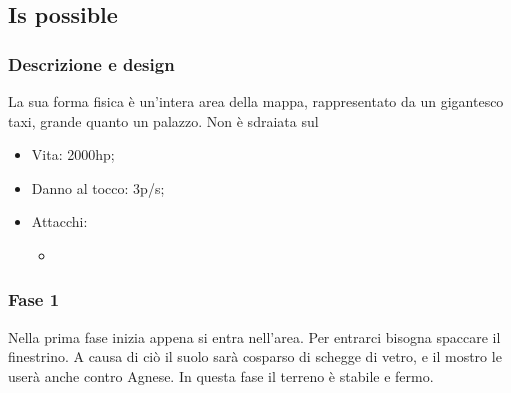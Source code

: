 \subsection{Is possible}

    \subsubsection{Descrizione e design}
        La sua forma fisica è un'intera area della mappa, rappresentato da un gigantesco taxi, grande quanto un palazzo.
        Non è sdraiata sul \\
        \begin{itemize}
            \item{Vita: 2000hp;}
            \item{Danno al tocco: 3p/s;}
            \item{Attacchi:
                \begin{itemize}
                    \item{}
                \end{itemize}
            }
        \end{itemize}
    
    \subsubsection{Fase 1}
        Nella prima fase inizia appena si entra nell'area. Per entrarci bisogna spaccare il finestrino.
        A causa di ciò il suolo sarà cosparso di schegge di vetro, e il mostro le userà anche contro Agnese.
        In questa fase il terreno è stabile e fermo.
